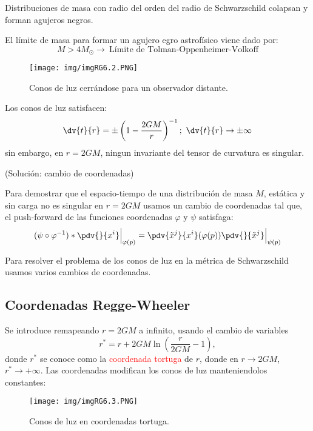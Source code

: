 \documentclass[../main]{subfiles}
\begin{document}
Distribuciones de masa con radio del orden del radio de Schwarzschild colapsan y forman agujeros negros.

El límite de masa para formar un agujero egro astrofísico viene dado por:
\begin{equation}
    M>4M_{\odot} \rightarrow \ \text{Límite de Tolman-Oppenheimer-Volkoff}
\end{equation}

\begin{figure}[h]
    \centering
    \texttt{[image: img/imgRG6.2.PNG]}
    \caption{Conos de luz cerrándose para un observador distante.}
\end{figure}

Los conos de luz satisfacen:
\begin{equation}
    \dv{t}{r}=\pm\left(1-\dfrac{2GM}{r}\right)^{-1};\ \dv{t}{r}\rightarrow \pm \infty
\end{equation}
sin embargo, en $r=2GM$, ningun invariante del tensor de curvatura es singular. 

(Solución: cambio de coordenadas)

Para demostrar que el espacio-tiempo de una distribución de masa $M$, estática y sin carga no es singular en $r=2GM$ usamos un cambio de coordenadas tal que, el push-forward de las funciones coordenadas $\varphi$ y $\psi$ satisfaga:
\begin{equation}
    (\psi \circ \varphi^{-1})* \pdv{}{x^{i}}\Big{|}_{\varphi(p)}=\pdv{\tilde{x}^j}{x^{i}}(\varphi(p))\pdv{}{\tilde{x}^j}\Big{|}_{\psi(p)}
\end{equation}

Para resolver el problema de los conos de luz en la métrica de Schwarzschild usamos varios cambios de coordenadas.

\subsection{Coordenadas Regge-Wheeler}

Se introduce remapeando $r=2GM$ a infinito, usando el cambio de variables
\begin{equation}
    r^*=r+2GM\ln\left(\dfrac{r}{2GM}-1\right),
\end{equation}
donde $r^*$ se conoce como la \textcolor{red}{coordenada tortuga} de $r$, donde en $r\rightarrow 2GM$, $r^* \rightarrow +\infty$. Las coordenadas modifican los conos de luz manteniendolos constantes:
\begin{figure}[h]
    \begin{center}
        \texttt{[image: img/imgRG6.3.PNG]}
        \caption{Conos de luz en coordenadas tortuga.}
    \end{center}
\end{figure}
\end{document}
